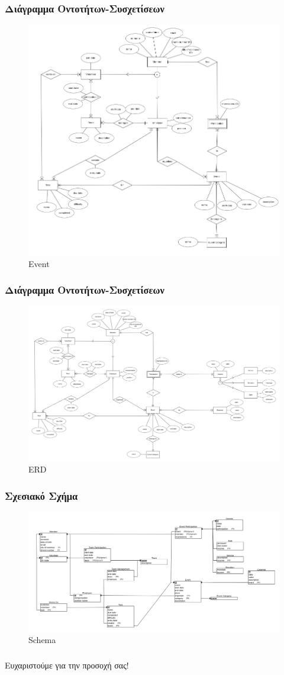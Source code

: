 \documentclass[pdf]{beamer}
\newcommand{\en}[1]{\foreignlanguage{english}{#1}}
\begin{document}
\begin{frame}
  \frametitle{Διάγραμμα Οντοτήτων-Συσχετίσεων}
  \begin{figure}
      \centering
      \includegraphics[width=.5\textwidth]{./images/event.png}
      \caption{\en{Event}}
  \end{figure}

\end{frame}

\begin{frame}
  \frametitle{Διάγραμμα Οντοτήτων-Συσχετίσεων}
  \begin{figure}
      \centering
      \includegraphics[width=\textwidth]{./images/erd.png}
      \caption{\en{ERD}}
  \end{figure}

\end{frame}

\begin{frame}
  \frametitle{Σχεσιακό Σχήμα}
  \begin{figure}
      \centering
      \includegraphics[width=\textwidth]{./images/schema.png}
      \caption{\en{Schema}}
   \end{figure}
  
\end{frame}




\begin{frame}
  \frametitle{}
  \centering Ευχαριστούμε για την προσοχή σας!

\end{frame}
\end{document}
